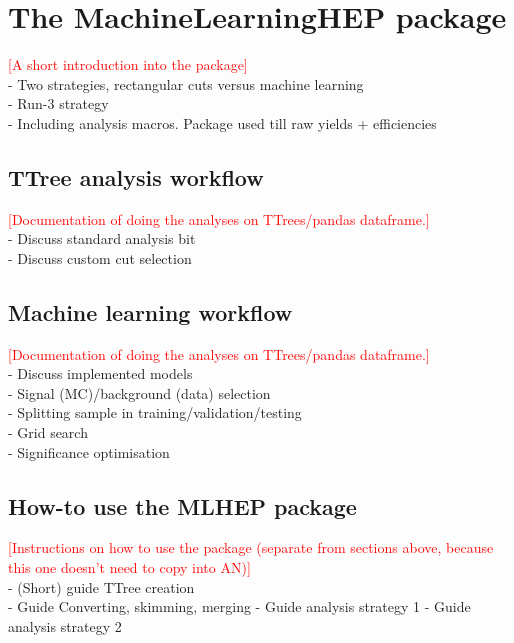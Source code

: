 \section{The MachineLearningHEP package}
\label{sec:MLHEPpackage}

\textcolor{red}{[A short introduction into the package]}  \\
- Two strategies, rectangular cuts versus machine learning \\
- Run-3 strategy \\
- Including analysis macros. Package used till raw yields + efficiencies \\

\subsection{TTree analysis workflow}

\textcolor{red}{[Documentation of doing the analyses on TTrees/pandas dataframe.]} \\
- Discuss standard analysis bit \\
- Discuss custom cut selection \\

\subsection{Machine learning workflow}

\textcolor{red}{[Documentation of doing the analyses on TTrees/pandas dataframe.]} \\
- Discuss implemented models \\
- Signal (MC)/background (data) selection \\
- Splitting sample in training/validation/testing \\
- Grid search \\
- Significance optimisation \\

\subsection{How-to use the MLHEP package}

\textcolor{red}{[Instructions on how to use the package (separate from sections above, because this one doesn't need to copy into AN)]} \\
- (Short) guide TTree creation \\
- Guide Converting, skimming, merging
- Guide analysis strategy 1
- Guide analysis strategy 2
